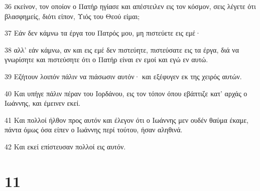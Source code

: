 \par 36 εκείνον, τον οποίον ο Πατήρ ηγίασε και απέστειλεν εις τον κόσμον, σεις λέγετε ότι βλασφημείς, διότι είπον, Υιός του Θεού είμαι;
\par 37 Εάν δεν κάμνω τα έργα του Πατρός μου, μη πιστεύετε εις εμέ·
\par 38 αλλ' εάν κάμνω, αν και εις εμέ δεν πιστεύητε, πιστεύσατε εις τα έργα, διά να γνωρίσητε και πιστεύσητε ότι ο Πατήρ είναι εν εμοί και εγώ εν αυτώ.
\par 39 Εζήτουν λοιπόν πάλιν να πιάσωσιν αυτόν· και εξέφυγεν εκ της χειρός αυτών.
\par 40 Και υπήγε πάλιν πέραν του Ιορδάνου, εις τον τόπον όπου εβάπτιζε κατ' αρχάς ο Ιωάννης, και έμεινεν εκεί.
\par 41 Και πολλοί ήλθον προς αυτόν και έλεγον ότι ο Ιωάννης μεν ουδέν θαύμα έκαμε, πάντα όμως όσα είπεν ο Ιωάννης περί τούτου, ήσαν αληθινά.
\par 42 Και εκεί επίστευσαν πολλοί εις αυτόν.

\chapter{11}

